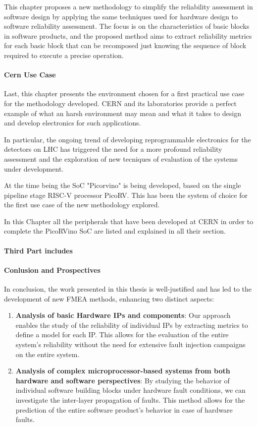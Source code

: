 \documentclass[./dissertation.tex]{subfiles}
\begin{document}
This chapter proposes a new methodology to simplify the reliability assessment in software design by applying the same techniques used for hardware design to software reliability assessment. The focus is on the characteristics of basic blocks in software products, and the proposed method aims to extract reliability metrics for each basic block that can be recomposed just knowing the sequence of block required to execute a precise operation.
\paragraph{Cern Use Case}
Last, this chapter presents the environment chosen for a first practical use case for the methodology developed. CERN and its laboratories provide a perfect example of what an harsh environment may mean and what it takes to design and develop electronics for such applications.

In particular, the ongoing trend of developing reprogrammable electronics for the detectors on LHC has triggered the need for a more profound reliability assessment and the exploration of new tecniques of evaluation of the systems under development.

At the time being the SoC "Picorvino" is being developed, based on the single pipeline stage RISC-V processor PicoRV. This has been the system of choice for the first use case of the new methodology explored.

In this Chapter all the peripherals that have been developed at CERN in order to complete the PicoRVino SoC are listed and explained in all their section.

\noindent \paragraph{Third Part includes}


\paragraph{Conlusion and Prospectives}
In conclusion, the work presented in this thesis is well-justified and has led to the development of new FMEA methods, enhancing two distinct aspects:

\begin{enumerate}
\item \textbf{Analysis of basic Hardware IPs and components}: Our approach enables the study of the reliability of individual IPs by extracting metrics to define a model for each IP. This allows for the evaluation of the entire system's reliability without the need for extensive fault injection campaigns on the entire system.
\item \textbf{Analysis of complex microprocessor-based systems from both hardware and software perspectives}: By studying the behavior of individual software building blocks under hardware fault conditions, we can investigate the inter-layer propagation of faults. This method allows for the prediction of the entire software product's behavior in case of hardware faults.
\end{enumerate}
\end{document}
